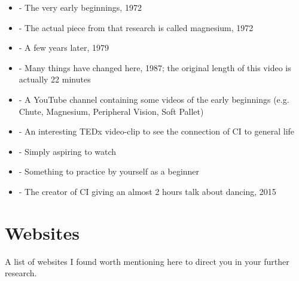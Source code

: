 \begin{itemize}
    \setlength\itemsep{0em}
    \item {} - The very early beginnings, 1972
    \item {} - The actual piece from that research is called magnesium, 1972
    \item {} - A few years later, 1979
    \item {} - Many things have changed here, 1987; the original length of this video is actually 22 minutes
    \item {} - A YouTube channel containing some videos of the early beginnings (e.g. Chute, Magnesium, Peripheral Vision, Soft Pallet)
    \item {} - An interesting TEDx video-clip to see the connection of CI to general life
    \item {} - Simply aspiring to watch
    \item {} - Something to practice by yourself as a beginner
    \item {} - The creator of CI giving an almost 2 hours talk about dancing, 2015
\end{itemize}

\section{Websites}\label{sec:websites}

A list of websites I found worth mentioning here to direct you in your further research.

